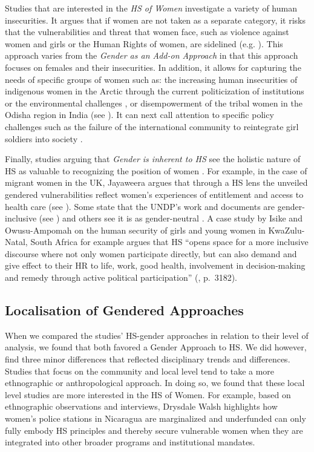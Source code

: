 \documentclass[10pt,a4paper]{article}
\begin{document}
\begin{multicols}{2}
Studies that are interested in the \textit{HS of Women} investigate a variety of human insecurities. It argues that if women are not taken as a separate category, it risks that the vulnerabilities and threat that women face, such as violence against women and girls or the Human Rights of women, are sidelined (e.g. \citep{R10,R45}). This approach varies from the \textit{Gender as an Add-on Approach} in that this approach focuses on females and their insecurities. In addition, it allows for capturing the needs of specific groups of women such as: the increasing human insecurities of indigenous women in the Arctic through the current politicization of institutions \citep{R46} or the environmental challenges \citep{R47}, or disempowerment of  the tribal women in the Odisha region in India (see \citep{R48}). It can next call attention to specific policy challenges such as the failure of the international community to reintegrate girl soldiers into society \citep{R49}.

Finally, studies arguing that \textit{Gender is inherent to HS} see the holistic nature of HS as valuable to recognizing the position of women \citep{R50}. For example, in the case of migrant women in the UK, Jayaweera argues that through a HS lens the unveiled gendered vulnerabilities reflect women's experiences of entitlement and access to health care (see \citep{R51}). Some state that the UNDP's work and documents are gender-inclusive (see \citep{R20}) and others see it is as gender-neutral \citep{R52}. A case study by Isike and Owusu-Ampomah \citep{R53} on the human security of girls and young women in KwaZulu-Natal, South Africa for example argues that HS ``opens space for a more inclusive discourse where not only women participate directly, but can also demand and give effect to their HR to life, work, good health, involvement in decision-making and remedy through active political participation'' (\citep{R53}, p.~3182).

\subsection{Localisation of Gendered Approaches}

\noindent When we compared the studies' HS-gender approaches in relation to their level of analysis, we found that both favored a Gender Approach to HS. We did however, find three minor differences that reflected disciplinary trends and differences. Studies that focus on the community and local level tend to take a more ethnographic or anthropological approach. In doing so, we found that these local level studies are more interested in the HS of Women. For example, based on ethnographic observations and interviews, Drysdale Walsh \citep{R54} highlights how women's police stations in Nicaragua are marginalized and underfunded can only fully embody HS principles and thereby secure vulnerable women when they are integrated into other broader programs and institutional mandates.


\end{multicols}
\end{document}
